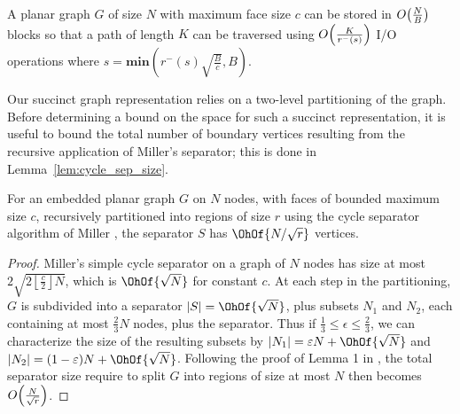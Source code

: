 {\begin{lemma}
  A planar graph $G$ of size $N$ with maximum face size $c$ 
  can be stored in
  $O\!\left( \frac{N}{B} \right)$ blocks so that a path of length $K$ can
  be traversed using $O\!\left( \frac{K}{ r^{-}(s) } \right)$ I/O operations
  where $s = \textbf{min}\left( r^{-}(s)\sqrt{\frac{B}{c}}, B \right)$.
\end{lemma}

Our succinct graph representation relies on a two-level partitioning of 
the graph.
Before determining a bound on the space for such a succinct representation,
it is useful to bound the total number of boundary vertices 
resulting from the recursive application of Miller's separator; this is 
done in Lemma~\ref{lem:cycle_sep_size}.

\begin{lemma}
  \label{lem:cycle_sep_size}
  For an embedded planar graph $G$ on $N$ nodes, with faces of
  bounded maximum size $c$, recursively partitioned into regions of
  size $r$ using the cycle separator algorithm of Miller
  \cite{miller_1986}, the separator $S$ has $\OhOf{N/\sqrt{r}}$
  vertices.
\end{lemma}

\begin{proof}
  Miller's simple cycle separator on a graph of $N$ nodes has size at
  most $2 \sqrt{ 2 \left\lfloor \frac{c}{2} \right\rfloor N}$, which
  is $\OhOf{\sqrt{N}}$ for constant $c$. At each step in the
  partitioning, $G$ is subdivided into a separator $|S| =
  \OhOf{\sqrt{N}}$, plus subsets $N_1$ and $N_2$, each containing at
  most $\frac{2}{3}N$ nodes, plus the separator. 
  Thus if $\frac{1}{3} \le \epsilon \le \frac{2}{3}$, 
  we can characterize the size of the
  resulting subsets by $|N_1| = \epsilon N + \OhOf{\sqrt{N}}$ and
  $|N_2| = (1-\epsilon)N + \OhOf{\sqrt{N}}$. Following the proof of
  Lemma 1 in \cite{Frederickson87}, the total separator size require to
  split $G$ into regions of size at most $N$ then becomes
  $O\!\left(\frac{N}{\sqrt{r}}\right)$.
\end{proof}

}
